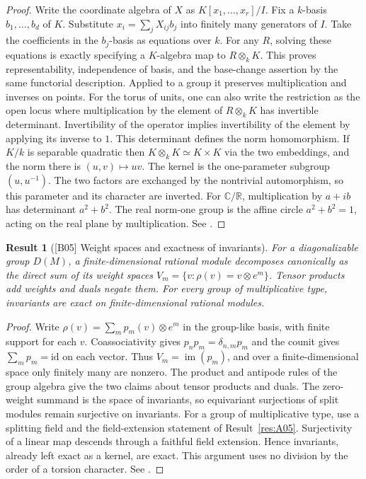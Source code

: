 \documentclass[11pt,a4paper,openany,oneside]{book}
\theoremstyle{resultstyle}
\newtheorem{statement}{Result}[chapter]
\newenvironment{result}[2]{\clubpenalty=10000\begin{statement}[\textnormal{[#1]} #2]\leavevmode\label{res:#1}\ignorespaces}{\end{statement}}
\theoremstyle{definition}
\numberwithin{equation}{chapter}
\begin{document}
\begin{proof}
Write the coordinate algebra of \(X\) as \(K[x_1,\ldots,x_r]/I\).
Fix a \(k\)-basis \(b_1,\ldots,b_d\) of \(K\). Substitute
\(x_i=\sum_j X_{ij}b_j\) into finitely many generators of \(I\).
Take the coefficients in the \(b_j\)-basis as equations over \(k\).
For any \(R\), solving these equations is exactly specifying a
\(K\)-algebra map to \(R\otimes_k K\). This proves representability,
independence of basis, and the base-change assertion by the same
functorial description. Applied to a group it preserves multiplication
and inverses on points. For the torus of units, one can also write
the restriction as the open locus where multiplication by the element
of \(R\otimes_k K\) has invertible determinant. Invertibility of the
operator implies invertibility of the element by applying its inverse
to \(1\). This determinant defines the norm homomorphism.
If \(K/k\) is separable quadratic then \(K\otimes_k K\simeq K\times K\)
via the two embeddings, and the norm there is \((u,v)\mapsto uv\).
The kernel is the one-parameter subgroup \((u,u^{-1})\).
The two factors are exchanged by the nontrivial automorphism,
so this parameter and its character are inverted. For
\(\mathbb C/\mathbb R\), multiplication by \(a+ib\) has determinant
\(a^2+b^2\). The real norm-one group is the affine circle
\(a^2+b^2=1\), acting on the real plane by multiplication.
See \cite[\S2.i and Example 12.27]{milne}.
\end{proof}

\begin{result}{B05}{Weight spaces and exactness of invariants}
For a diagonalizable group \(D(M)\), a finite-dimensional rational
module decomposes canonically as the direct sum of its weight spaces
\(V_m=\{v:\rho(v)=v\otimes e^m\}\). Tensor products add weights and
duals negate them. For every group of multiplicative type, invariants
are exact on finite-dimensional rational modules.
\end{result}

\begin{proof}
Write \(\rho(v)=\sum_m p_m(v)\otimes e^m\) in the group-like basis,
with finite support for each \(v\). Coassociativity gives
\(p_n p_m=\delta_{n,m}p_m\) and the counit gives \(\sum_m p_m=\mathrm{id}\)
on each vector. Thus \(V_m=\operatorname{im}(p_m)\), and over a
finite-dimensional space only finitely many are nonzero. The product
and antipode rules of the group algebra give the two claims about
tensor products and duals. The zero-weight summand is the space of
invariants, so equivariant surjections of split modules remain
surjective on invariants. For a group of multiplicative type, use a
splitting field and the field-extension statement of
Result~\ref{res:A05}. Surjectivity of a linear map descends through a
faithful field extension. Hence invariants, already left exact as a
kernel, are exact. This argument uses no division by the order of
a torsion character. See \cite[Theorem 12.12, Definition 12.52
and Proposition 12.54]{milne}.
\end{proof}
\end{document}
